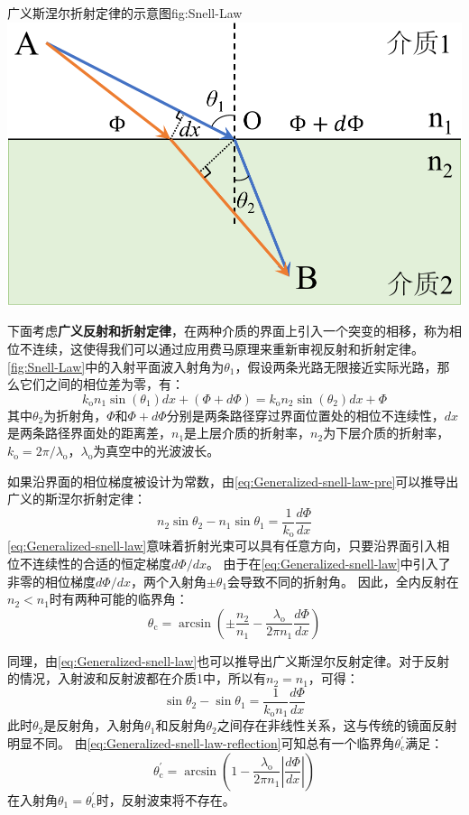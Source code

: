 \documentclass[supercite]{HustGraduPaper}
\begin{document}
\begin{generalfig}[htb]{广义斯涅尔折射定律的示意图}{fig:Snell-Law}
	\includegraphics[width=0.5\linewidth]{Figures/Snell-Law.pdf}
\end{generalfig}

下面考虑{\bfseries 广义反射和折射定律}，在两种介质的界面上引入一个突变的相移，称为相位不连续，这使得我们可以通过应用费马原理来重新审视反射和折射定律。
\autoref{fig:Snell-Law}中的入射平面波入射角为$\theta_1$，假设两条光路无限接近实际光路，那么它们之间的相位差为零，有：
\begin{equation}
	k_\mathrm{o} n_1 \sin (\theta_1) dx + (\Phi + d\Phi) = k_\mathrm{o} n_2 \sin (\theta_2) dx + \Phi
	\label{eq:Generalized-snell-law-pre}
\end{equation}
其中$ \theta_2 $为折射角，$ \Phi $和$ \Phi + d\Phi $分别是两条路径穿过界面位置处的相位不连续性，$ dx $是两条路径界面处的距离差，$n_1$是上层介质的折射率，$n_2$为下层介质的折射率，$k_\mathrm{o}=2 \pi / \lambda_\mathrm{o}$，$\lambda_\mathrm{o}$为真空中的光波波长。

如果沿界面的相位梯度被设计为常数，由\autoref{eq:Generalized-snell-law-pre}可以推导出广义的斯涅尔折射定律：
\begin{equation}
	n_2 \sin \theta_2 - n_1 \sin \theta_1 = \frac{1}{k_\mathrm{o}} \frac{d \Phi}{dx}
	\label{eq:Generalized-snell-law}
\end{equation}
\autoref{eq:Generalized-snell-law}意味着折射光束可以具有任意方向，只要沿界面引入相位不连续性的合适的恒定梯度$d\Phi/dx$。
由于在\autoref{eq:Generalized-snell-law}中引入了非零的相位梯度$d\Phi/dx$，两个入射角$\pm \theta_1$会导致不同的折射角。
因此，全内反射在$n_2<n_1$时有两种可能的临界角：
\begin{equation}
	\theta_{\mathrm{c}}=\arcsin \left(\pm \frac{n_{2}}{n_{1}}-\frac{\lambda_{\mathrm{o}}}{2 \pi n_{1}} \frac{d \Phi}{d x}\right)
\end{equation}

同理，由\autoref{eq:Generalized-snell-law}也可以推导出广义斯涅尔反射定律。对于反射的情况，入射波和反射波都在介质1中，所以有$n_2=n_1$，可得：
\begin{equation}
	\sin \theta_2 - \sin \theta_1 = \frac{1}{k_\mathrm{o} n_1} \frac{d \Phi}{dx}
	\label{eq:Generalized-snell-law-reflection}
\end{equation}
此时$\theta_2$是反射角，入射角$\theta_1$和反射角$\theta_2$之间存在非线性关系，这与传统的镜面反射明显不同。
由\autoref{eq:Generalized-snell-law-reflection}可知总有一个临界角$\theta_{\mathrm{c}}^{\prime}$满足：
\begin{equation}
	\theta_{\mathrm{c}}^{\prime}=\arcsin \left(1-\frac{\lambda_{\mathrm{o}}}{2 \pi n_{1}}\left|\frac{d \Phi}{d x}\right|\right)
\end{equation}
在入射角$\theta_1 = \theta_{\mathrm{c}}^{\prime}$时，反射波束将不存在。
\end{document}
